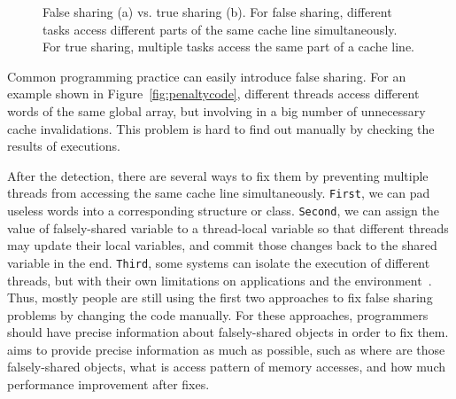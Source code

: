 \begin{figure}[htbp]
\centering
{}%
\hspace{30pt}
%
\caption{False sharing (a) vs. true sharing (b). For false sharing, different tasks access different parts of the same cache line simultaneously. For true sharing, multiple tasks access the same part of a cache line.\label{fig:falsesharing}}
\end{figure}

Common programming practice can easily introduce false sharing. For an example shown in Figure~\ref{fig:penaltycode}, different threads access different words of the same global array, but involving in a big number of unnecessary cache invalidations. This problem is hard to find out manually by checking the results of executions.  

After the detection, there are several ways to fix them by preventing multiple threads from accessing the same cache line simultaneously. {\tt First},  we can pad useless words into a corresponding structure or class. {\tt Second}, we can assign the value of falsely-shared variable to a thread-local variable so that different threads may update their local variables, and commit those changes back to the shared variable in the end. {\tt Third},  some systems can isolate the execution of different threads, but with their own limitations on applications and the environment~\cite{sheriff, OSdetection}. 
Thus, mostly people are still using the first two approaches to fix false sharing problems by changing the code manually. For these approaches, programmers should have precise information about falsely-shared objects in order to fix them. \cheetah{} aims to provide precise information as much as possible, such as where are those falsely-shared objects, what is access pattern of memory accesses, and how much performance improvement after fixes. 


